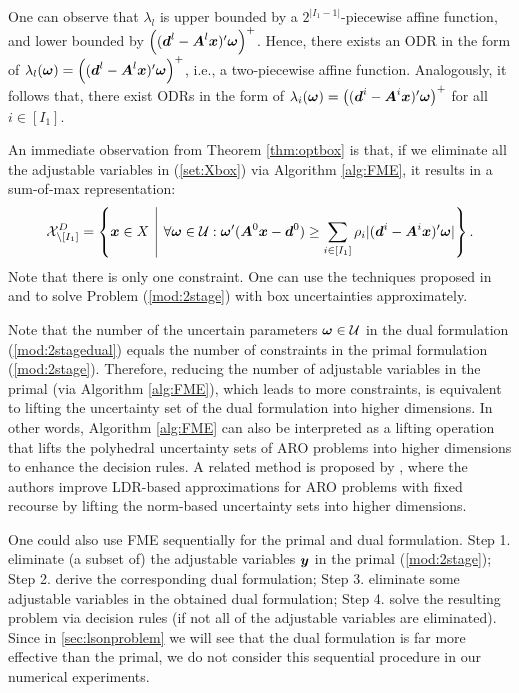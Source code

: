 \documentclass[fleqn,mnsc,blindrev]{informs4}
\newcommand{\mb}[1]{\mbox{\boldmath \ensuremath{#1}}}
\begin{document}
	One can observe that $\lambda_l$ is upper bounded by a $2^{|I_1-1|}$-piecewise affine function, and lower bounded by $\left((\mb{d}^l- \mb{A}^l\mb{x})'\mb{\omega}\right)^+$. Hence, there exists an ODR in the form of $\lambda_l(\mb{\omega})=\left((\mb{d}^l- \mb{A}^l\mb{x})'\mb{\omega}\right)^+$, i.e., a two-piecewise affine function. Analogously, it follows that, there exist ODRs in the form of  $\lambda_i(\mb{\omega})=\left((\mb{d}^i- \mb{A}^i\mb{x})'\mb{\omega}\right)^+$ for all $i\in [I_1]$.   \hfill \Halmos
	
	An immediate observation from Theorem \ref{thm:optbox} is that, if we eliminate all the adjustable variables in (\ref{set:Xbox}) via Algorithm \ref{alg:FME}, it results in a sum-of-max representation:
\begin{equation*}
		\mathcal{X}^D_{\setminus [I_1]}=  \left\{ \mb{x} \in X \enskip \vline \enskip \forall \mb{\omega} \in \mathcal{U}:  \mb{\omega}' (\mb{A}^0\mb{x}-\mb{d}^0)  \ge 	 \sum_{i \in [I_1]}  \rho_i|(\mb{d}^i- \mb{A}^i\mb{x})'\mb{\omega}| 		\right\}.
\end{equation*}
	Note that there is only one constraint. One can use the techniques proposed in \cite{gd13} and \cite{ad16b} to solve Problem (\ref{mod:2stage}) with box uncertainties approximately. 

	 {Note that the number of the uncertain parameters $\mb{\omega}\in \mathcal{U}$ in the dual formulation (\ref{mod:2stagedual}) equals the number of constraints in the primal formulation (\ref{mod:2stage}). Therefore, reducing the number of adjustable variables in the primal (via Algorithm \ref{alg:FME}), which leads to more constraints, is equivalent to lifting the uncertainty set of the dual formulation into higher dimensions. In other words, Algorithm \ref{alg:FME} can also be interpreted as a lifting operation that lifts the polyhedral uncertainty sets of ARO problems into higher dimensions to enhance the decision rules. A related method is proposed by \cite{cz09}, where the authors improve LDR-based approximations for ARO problems with fixed recourse by lifting the norm-based uncertainty sets into higher dimensions. 
		
    One could also use FME sequentially for the primal and dual formulation. Step 1. eliminate (a subset of) the adjustable variables $\mb{y}$ in the primal (\ref{mod:2stage}); Step 2. derive the corresponding dual formulation; Step 3.  eliminate some adjustable variables in the obtained dual formulation; Step 4. solve the resulting problem via decision rules (if not all of the adjustable variables are eliminated). Since in \textsection \ref{sec:lsonproblem} we will see that the dual formulation is far more effective than the primal, we do not consider this sequential procedure in our numerical experiments.}
	
\end{document}
